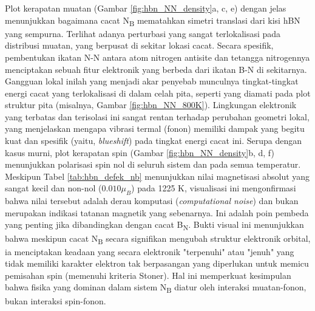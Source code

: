 Plot kerapatan muatan (Gambar \ref{fig:hbn_NN_density}a, c, e) dengan jelas menunjukkan bagaimana cacat N\textsubscript{B} mematahkan simetri translasi dari kisi hBN yang sempurna.
Terlihat adanya perturbasi yang sangat terlokalisasi pada distribusi muatan, yang berpusat di sekitar lokasi cacat.
Secara spesifik, pembentukan ikatan N-N antara atom nitrogen antisite dan tetangga nitrogennya menciptakan sebuah fitur elektronik yang berbeda dari ikatan B-N di sekitarnya.
Gangguan lokal inilah yang menjadi akar penyebab munculnya tingkat-tingkat energi cacat yang terlokalisasi di dalam celah pita, seperti yang diamati pada plot struktur pita (misalnya, Gambar \ref{fig:hbn_NN_800K}).
Lingkungan elektronik yang terbatas dan terisolasi ini sangat rentan terhadap perubahan geometri lokal, yang menjelaskan mengapa vibrasi termal (fonon) memiliki dampak yang begitu kuat dan spesifik (yaitu, \emph{blueshift}) pada tingkat energi cacat ini.
Serupa dengan kasus murni, plot kerapatan spin (Gambar \ref{fig:hbn_NN_density}b, d, f) menunjukkan polarisasi spin nol di seluruh sistem dan pada semua temperatur.
Meskipun Tabel \ref{tab:hbn_defek_nb} menunjukkan nilai magnetisasi absolut yang sangat kecil dan non-nol ($0.010 \mu_B$) pada 1225 K, visualisasi ini mengonfirmasi bahwa nilai tersebut adalah derau komputasi (\emph{computational noise}) dan bukan merupakan indikasi tatanan magnetik yang sebenarnya.
Ini adalah poin pembeda yang penting jika dibandingkan dengan cacat B\textsubscript{N}.
Bukti visual ini menunjukkan bahwa meskipun cacat N\textsubscript{B} secara signifikan mengubah struktur elektronik orbital, ia menciptakan keadaan yang secara elektronik "terpenuhi" atau "jenuh" yang tidak memiliki karakter elektron tak berpasangan yang diperlukan untuk memicu pemisahan spin (memenuhi kriteria Stoner).
Hal ini memperkuat kesimpulan bahwa fisika yang dominan dalam sistem N\textsubscript{B} diatur oleh interaksi muatan-fonon, bukan interaksi spin-fonon.

